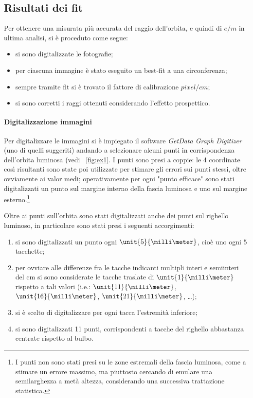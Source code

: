 \documentclass[10pt,a4paper]{article}
\begin{document}
\subsection{Risultati dei fit}

Per ottenere una misurata più accurata del raggio dell'orbita, e quindi di $e/m$ in ultima analisi, si è proceduto come segue:
\begin{itemize}
	\item si sono digitalizzate le fotografie;
	\item per ciascuna immagine è stato eseguito un best-fit a una circonferenza;
	\item sempre tramite fit si è trovato il fattore di calibrazione $pixel/cm$;
	\item si sono corretti i raggi ottenuti considerando l'effetto prospettico.
\end{itemize}

\paragraph{Digitalizzazione immagini} Per digitalizzare le immagini si è impiegato il software \emph{GetData Graph Digitizer} (uno di quelli suggeriti) andando a selezionare alcuni punti in corrispondenza dell'orbita luminosa (vedi \figurename{~\ref{fig:ex1}}.
I punti sono presi a coppie: le 4 coordinate così risultanti sono state poi utilizzate per stimare gli errori sui punti stessi, oltre ovviamente ai valor medi; operativamente per ogni "punto efficace" sono stati digitalizzati un punto sul margine interno della fascia luminosa e uno sul margine esterno.\footnote{I punti non sono stati presi su le zone estremali della fascia luminosa, come a stimare un errore massimo, ma piuttosto cercando di emulare una semilarghezza a metà altezza, considerando una successiva trattazione statistica.}

Oltre ai punti sull'orbita sono stati digitalizzati anche dei punti sul righello luminoso, in particolare sono stati presi i seguenti accorgimenti:
\begin{enumerate}
	\item si sono digitalizzati un punto ogni $\unit{5}{\milli\meter}$, cioè uno ogni 5 tacchette;
	\item per ovviare alle differenze fra le tacche indicanti multipli interi e semiinteri del cm si sono considerate le tacche traslate di $\unit{1}{\milli\meter}$ rispetto a tali valori (i.e.: $\unit{11}{\milli\meter}$, $\unit{16}{\milli\meter}$, $\unit{21}{\milli\meter}$, \dots);
	\item si è scelto di digitalizzare per ogni tacca l'estremità inferiore;
	\item si sono digitalizzati 11 punti, corrispondenti a tacche del righello abbastanza centrate rispetto al bulbo.
\end{enumerate}
\end{document}
